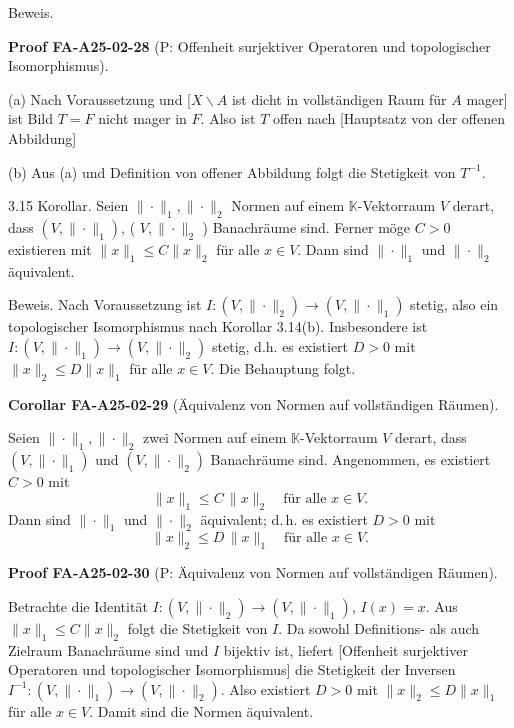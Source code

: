 \documentclass[10pt, letterpaper]{article}
\newcommand{\CustomHeading}[3]{%
  \par\medskip\noindent%
  \textbf{#1 #2} \textnormal{(#3)}.\enskip%
}
\newenvironment{KORO}[2]{\begin{unitbox}\CustomHeading{Corollar}{#1}{#2}}{\end{unitbox}}
\newenvironment{PROOF}[2]{\begin{unitbox}\CustomHeading{Proof}{#1}{#2}}{\end{unitbox}}
\begin{document}
Beweis. 

\begin{PROOF}{FA-A25-02-28}{P: Offenheit surjektiver Operatoren und topologischer Isomorphismus}
(a) Nach Voraussetzung und [$X\backslash A$ ist dicht in vollständigen Raum für $A$ mager] ist Bild $T=F$ nicht mager in $F$. Also ist $T$ offen nach [Hauptsatz von der offenen Abbildung]

(b) Aus (a) und Definition von offener Abbildung folgt die Stetigkeit von $T^{-1}$.
\end{PROOF}


3.15 Korollar. Seien $\|\cdot\|_{1},\|\cdot\|_{2}$ Normen auf einem $\mathbb{K}$-Vektorraum $V$ derart, dass $\left(V,\|\cdot\|_{1}\right)$, ( $V,\|\cdot\|_{2}$ ) Banachräume sind. Ferner möge $C>0$ existieren mit $\|x\|_{1} \leq C\|x\|_{2}$ für alle $x \in V$. Dann sind $\|\cdot\|_{1}$ und $\|\cdot\|_{2}$ äquivalent.

Beweis. Nach Voraussetzung ist $I:\left(V,\|\cdot\|_{2}\right) \rightarrow\left(V,\|\cdot\|_{1}\right)$ stetig, also ein topologischer Isomorphismus nach Korollar 3.14(b). Insbesondere ist $I:\left(V,\|\cdot\|_{1}\right) \rightarrow\left(V,\|\cdot\|_{2}\right)$ stetig, d.h. es existiert $D>0$ mit $\|x\|_{2} \leq D\|x\|_{1}$ für alle $x \in V$. Die Behauptung folgt.


\begin{KORO}{FA-A25-02-29}{Äquivalenz von Normen auf vollständigen Räumen}
Seien $\|\cdot\|_{1},\|\cdot\|_{2}$ zwei Normen auf einem $\mathbb{K}$-Vektorraum $V$ derart, 
dass $(V,\|\cdot\|_{1})$ und $(V,\|\cdot\|_{2})$ Banachräume sind. 
Angenommen, es existiert $C>0$ mit
\[
\|x\|_{1}\le C\,\|x\|_{2}\quad\text{für alle }x\in V.
\]
Dann sind $\|\cdot\|_{1}$ und $\|\cdot\|_{2}$ äquivalent; d.\,h. es existiert $D>0$ mit
\[
\|x\|_{2}\le D\,\|x\|_{1}\quad\text{für alle }x\in V.
\]
\end{KORO}



\begin{PROOF}{FA-A25-02-30}{P: Äquivalenz von Normen auf vollständigen Räumen}
Betrachte die Identität $I:(V,\|\cdot\|_{2})\to (V,\|\cdot\|_{1})$, $I(x)=x$. 
Aus $\|x\|_{1}\le C\|x\|_{2}$ folgt die Stetigkeit von $I$. 
Da sowohl Definitions- als auch Zielraum Banachräume sind und $I$ bijektiv ist, 
liefert [Offenheit surjektiver Operatoren und topologischer Isomorphismus] die Stetigkeit der Inversen 
$I^{-1}:(V,\|\cdot\|_{1})\to (V,\|\cdot\|_{2})$. Also existiert $D>0$ mit $\|x\|_{2}\le D\|x\|_{1}$ für alle $x\in V$. 
Damit sind die Normen äquivalent.
\end{PROOF}
\end{document}
